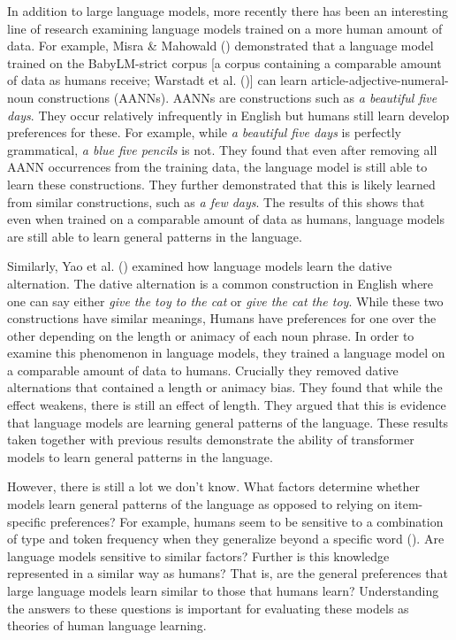 \documentclass[
  12pt,
  letterpaper,
]{scrreprt}
\begin{document}
In addition to large language models, more recently there has been an
interesting line of research examining language models trained on a more
human amount of data. For example, Misra \& Mahowald
() demonstrated that a
language model trained on the BabyLM-strict corpus {[}a corpus
containing a comparable amount of data as humans receive; Warstadt et
al. (){]} can
learn article-adjective-numeral-noun constructions (AANNs). AANNs are
constructions such as \emph{a beautiful five days}. They occur
relatively infrequently in English but humans still learn develop
preferences for these. For example, while \emph{a beautiful five days}
is perfectly grammatical, \emph{a blue five pencils} is not. They found
that even after removing all AANN occurrences from the training data,
the language model is still able to learn these constructions. They
further demonstrated that this is likely learned from similar
constructions, such as \emph{a few days}. The results of this shows that
even when trained on a comparable amount of data as humans, language
models are still able to learn general patterns in the language.

Similarly, Yao et al. ()
examined how language models learn the dative alternation. The dative
alternation is a common construction in English where one can say either
\emph{give the toy to the cat} or \emph{give the cat the toy}. While
these two constructions have similar meanings, Humans have preferences
for one over the other depending on the length or animacy of each noun
phrase. In order to examine this phenomenon in language models, they
trained a language model on a comparable amount of data to humans.
Crucially they removed dative alternations that contained a length or
animacy bias. They found that while the effect weakens, there is still
an effect of length. They argued that this is evidence that language
models are learning general patterns of the language. These results
taken together with previous results demonstrate the ability of
transformer models to learn general patterns in the language.

However, there is still a lot we don't know. What factors determine
whether models learn general patterns of the language as opposed to
relying on item-specific preferences? For example, humans seem to be
sensitive to a combination of type and token frequency when they
generalize beyond a specific word
().
Are language models sensitive to similar factors? Further is this
knowledge represented in a similar way as humans? That is, are the
general preferences that large language models learn similar to those
that humans learn? Understanding the answers to these questions is
important for evaluating these models as theories of human language
learning.
\end{document}
